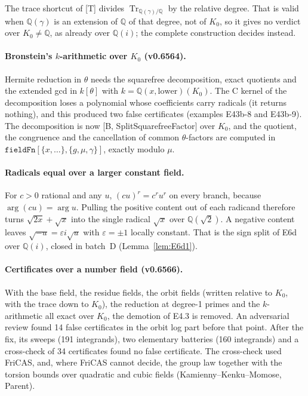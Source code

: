 \documentclass[11pt]{article}
\theoremstyle{definition}
\theoremstyle{remark}
\newcommand{\Q}{\mathbb{Q}}
\newcommand{\code}[1]{\texttt{#1}}
\begin{document}
The trace shortcut of [T] divides $\operatorname{Tr}_{\Q(\gamma)/\Q}$ by the
relative degree. That is valid when $\Q(\gamma)$ is an extension of $\Q$ of
that degree, not of $K_0$, so it gives no verdict over $K_0\ne\Q$, as already
over $\Q(i)$; the complete construction decides instead.


\paragraph{Bronstein's $k$-arithmetic over $K_0$ (v0.6564).} Hermite reduction
in $\theta$ needs the squarefree decomposition, exact quotients and the
extended gcd in $k[\theta]$ with $k=\Q(x,\text{lower})(K_0)$. The C kernel of
the decomposition loses a polynomial whose coefficients carry radicals (it
returns nothing), and this produced two false certificates (examples E43b-8 and
E43b-9). The decomposition is now [B, SplitSquarefreeFactor] over $K_0$, and
the quotient, the congruence and the cancellation of common $\theta$-factors
are computed in $\code{fieldFn}[\{x,\dots\},\{g,\mu,\gamma\}]$, exactly modulo
$\mu$.

\paragraph{Radicals equal over a larger constant field.} For $c>0$ rational and
any $u$, $(cu)^r=c^ru^r$ on every branch, because $\arg(cu)=\arg u$. Pulling the
positive content out of each radicand therefore turns $\sqrt{2x}+\sqrt x$ into
the single radical $\sqrt x$ over $\Q(\sqrt2)$. A negative content leaves
$\sqrt{-u}=\varepsilon i\sqrt u$ with $\varepsilon=\pm1$ locally constant. That
is the sign split of E6d over $\Q(i)$, closed in batch~D (Lemma~\ref{lem:E6d1}).


\paragraph{Certificates over a number field (v0.6566).} With the base field,
the residue fields, the orbit fields (written relative to $K_0$, with the trace
down to $K_0$), the reduction at degree-1 primes and the $k$-arithmetic all
exact over $K_0$, the demotion of E4.3 is removed. An adversarial review found
14 false certificates in the orbit log part before that point. After the fix,
its sweeps (191 integrands), two elementary batteries (160 integrands) and a
cross-check of 34 certificates found no false certificate. The cross-check used
FriCAS, and, where FriCAS cannot decide, the group law together with the
torsion bounds over quadratic and cubic fields (Kamienny--Kenku--Momose,
Parent).
\end{document}
